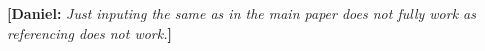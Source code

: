 \documentclass[twoside]{article}
\newcommand{\daniel}[1]{{\color{violet}\textbf{[Daniel:} \textit{#1}\textbf{]}}}
\begin{document}
%

%

\onecolumn
{}

\daniel{Just inputing the same as in the main paper does not fully work as referencing does not work.}


\vfill
\end{document}
